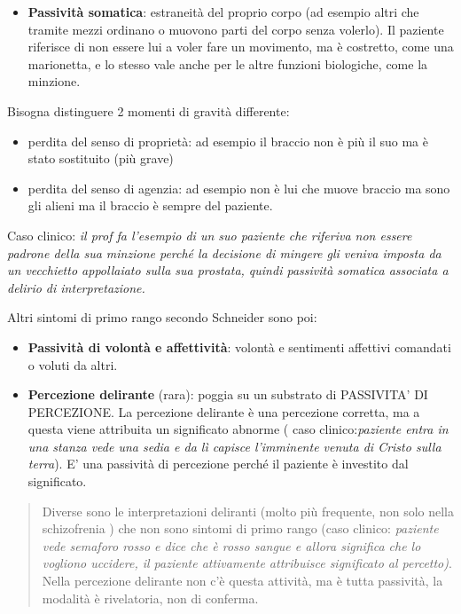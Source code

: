 \documentclass[]{article}
\begin{document}
\begin{itemize}
\item
  \textbf{Passività somatica}: estraneità del proprio corpo (ad esempio
  altri che tramite mezzi ordinano o muovono parti del corpo senza
  volerlo). Il paziente riferisce di non essere lui a voler fare un
  movimento, ma è costretto, come una marionetta, e lo stesso vale anche
  per le altre funzioni biologiche, come la minzione.
\end{itemize}

Bisogna distinguere 2 momenti di gravità differente:

\begin{itemize}
\item
  perdita del senso di proprietà: ad esempio il braccio non è più il suo
  ma è stato sostituito (più grave)
\item
  perdita del senso di agenzia: ad esempio non è lui che muove braccio
  ma sono gli alieni ma il braccio è sempre del paziente.
\end{itemize}

Caso clinico: \emph{il prof fa l'esempio di un suo paziente che riferiva
non essere padrone della sua minzione perché la decisione di mingere gli
veniva imposta da un vecchietto appollaiato sulla sua prostata, quindi
passività somatica associata a delirio di interpretazione.}

Altri sintomi di primo rango secondo Schneider sono poi:

\begin{itemize}
\item
  \textbf{Passività di volontà e affettività}: volontà e sentimenti
  affettivi comandati o voluti da altri.
\item
  \textbf{Percezione delirante} (rara): poggia su un substrato di
  PASSIVITA' DI PERCEZIONE. La percezione delirante è una percezione
  corretta, ma a questa viene attribuita un significato abnorme ( caso
  clinico:\emph{paziente entra in una stanza vede una sedia e da lì
  capisce l'imminente venuta di Cristo sulla terra}). E' una passività
  di percezione perché il paziente è investito dal significato.
\end{itemize}

\begin{quote}
Diverse sono le interpretazioni deliranti (molto più frequente, non solo
nella schizofrenia ) che non sono sintomi di primo rango (caso clinico:
\emph{paziente vede semaforo rosso e dice che è rosso sangue e allora
significa che lo vogliono uccidere, il paziente attivamente attribuisce
significato al percetto)}. Nella percezione delirante non c'è questa
attività, ma è tutta passività, la modalità è rivelatoria, non di
conferma.
\end{quote}
\end{document}
